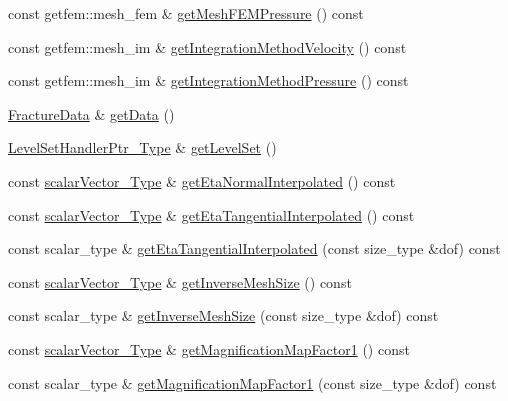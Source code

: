 \begin{DoxyCompactItemize}
const getfem\-::mesh\-\_\-fem \& \hyperlink{classFractureHandler_a6dc20a9624f9dff49b1c58f0dd261002}{get\-Mesh\-F\-E\-M\-Pressure} () const 
\item 
const getfem\-::mesh\-\_\-im \& \hyperlink{classFractureHandler_afe4c174c17862ed30b99ebe4a80aa695}{get\-Integration\-Method\-Velocity} () const 
\item 
const getfem\-::mesh\-\_\-im \& \hyperlink{classFractureHandler_ad7afd53439c3067f46a0fb6e1473d661}{get\-Integration\-Method\-Pressure} () const 
\item 
\hyperlink{classFractureData}{Fracture\-Data} \& \hyperlink{classFractureHandler_a68ed77a8d9816a472700ee4bcf2f505d}{get\-Data} ()
\item 
\hyperlink{LevelSetHandler_8h_aba343569cb3213c103252f69c39cad0b}{Level\-Set\-Handler\-Ptr\-\_\-\-Type} \& \hyperlink{classFractureHandler_af37ab12a17f812a960da2aa71699ba0f}{get\-Level\-Set} ()
\item 
const \hyperlink{Core_8h_a4e75b5863535ba1dd79942de2846eff0}{scalar\-Vector\-\_\-\-Type} \& \hyperlink{classFractureHandler_ac5cab221c35c03c72b264d73564d5e38}{get\-Eta\-Normal\-Interpolated} () const 
\item 
const \hyperlink{Core_8h_a4e75b5863535ba1dd79942de2846eff0}{scalar\-Vector\-\_\-\-Type} \& \hyperlink{classFractureHandler_a06b6f81d62ccd91ec1253cd41ffae808}{get\-Eta\-Tangential\-Interpolated} () const 
\item 
const scalar\-\_\-type \& \hyperlink{classFractureHandler_a47c7f4161817ebf6cd978cf6b2caa74f}{get\-Eta\-Tangential\-Interpolated} (const size\-\_\-type \&dof) const 
\item 
const \hyperlink{Core_8h_a4e75b5863535ba1dd79942de2846eff0}{scalar\-Vector\-\_\-\-Type} \& \hyperlink{classFractureHandler_a3f78aef488ef82ac8384bdd9e39a9be5}{get\-Inverse\-Mesh\-Size} () const 
\item 
const scalar\-\_\-type \& \hyperlink{classFractureHandler_a1e1ba24caa1e789b199252c3c34f696d}{get\-Inverse\-Mesh\-Size} (const size\-\_\-type \&dof) const 
\item 
const \hyperlink{Core_8h_a4e75b5863535ba1dd79942de2846eff0}{scalar\-Vector\-\_\-\-Type} \& \hyperlink{classFractureHandler_abaf5f99ba68775a587d6b3f0222e8b9a}{get\-Magnification\-Map\-Factor1} () const 
\item 
const scalar\-\_\-type \& \hyperlink{classFractureHandler_a1cafea5a92ab3a9b5eae67c347867f58}{get\-Magnification\-Map\-Factor1} (const size\-\_\-type \&dof) const 
\item 

\end{DoxyCompactItemize}
